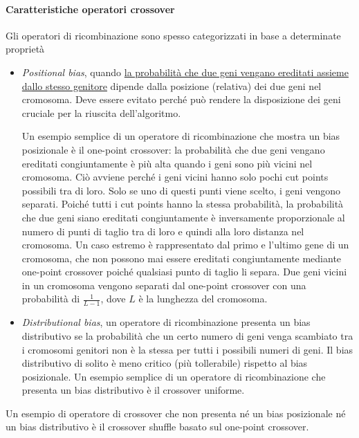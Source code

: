 \paragraph{Caratteristiche operatori crossover}
Gli operatori di ricombinazione sono spesso categorizzati in base a determinate proprietà
\begin{itemize}
    \item \textit{Positional bias}, quando \uline{la probabilità che due geni vengano ereditati assieme dallo stesso genitore} dipende dalla posizione (relativa) dei due geni nel cromosoma. Deve essere evitato perché può rendere la disposizione dei geni cruciale per la riuscita dell’algoritmo.

    Un esempio semplice di un operatore di ricombinazione che mostra un bias posizionale è il one-point crossover: la probabilità che due geni vengano ereditati congiuntamente è più alta quando i geni sono più vicini nel cromosoma. Ciò avviene perché i geni vicini hanno solo pochi cut points possibili tra di loro. Solo se uno di questi punti viene scelto, i geni vengono separati. Poiché tutti i cut points hanno la stessa probabilità, la probabilità che due geni siano ereditati congiuntamente è inversamente proporzionale al numero di punti di taglio tra di loro e quindi alla loro distanza nel cromosoma. Un caso estremo è rappresentato dal primo e l'ultimo gene di un cromosoma, che non possono mai essere ereditati congiuntamente mediante one-point crossover poiché qualsiasi punto di taglio li separa. Due geni vicini in un cromosoma vengono separati dal one-point crossover con una probabilità di $\frac{1}{L - 1}$, dove $L$ è la lunghezza del cromosoma.
    \item \textit{Distributional bias}, un operatore di ricombinazione presenta un bias distributivo se la probabilità che un certo numero di geni venga scambiato tra i cromosomi genitori non è la stessa per tutti i possibili numeri di geni. Il bias distributivo di solito è meno critico (più tollerabile) rispetto al bias posizionale. Un esempio semplice di un operatore di ricombinazione che presenta un bias distributivo è il crossover uniforme. 
\end{itemize}
Un esempio di operatore di crossover che non presenta né un bias posizionale né un bias distributivo è il crossover shuffle basato sul one-point crossover.

